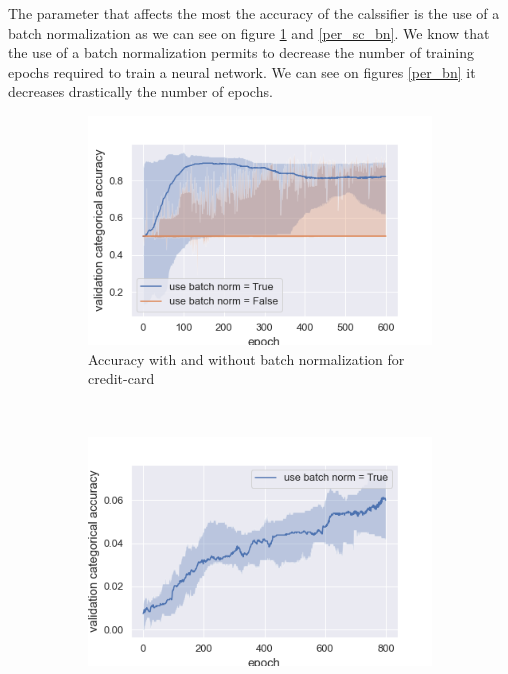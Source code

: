 \documentclass[10pt]{article}
\begin{document}
		The parameter that affects the most the accuracy of the calssifier is the use of a batch normalization as we can see on figure \ref{per_cc_bn} and \ref{per_sc_bn}. We know that the use of a batch normalization permits to decrease the number of training epochs required to train a neural network. We can see on figures \ref{per_bn} it decreases drastically the number of epochs.

		\begin{figure}
			\centering
			\begin{subfigure}[]{0.45\columnwidth}
				\centering
				\includegraphics[width=\linewidth]{../graphics/per_creditcard_epoch_score_type_use_batch_norm.png}
				\caption{Accuracy with and without batch normalization for credit-card}
				\label{per_cc_bn}
			\end{subfigure}~
				\begin{subfigure}[]{0.45\columnwidth}
				\centering
				\includegraphics[width=\linewidth]{../graphics/per_starcraft_epoch_score_type_use_batch_norm.png}

\end{subfigure}
\end{figure}
\end{document}
